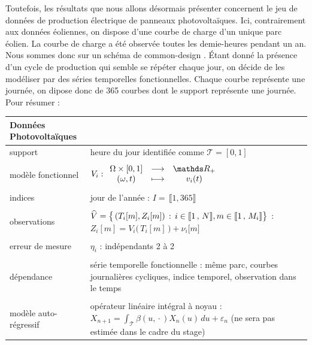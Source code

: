 \bigskip

Toutefois, les résultats que nous allons désormais présenter concernent le jeu de données de production électrique de panneaux photovoltaïques. Ici, contrairement aux données éoliennes, on dispose d'une courbe de charge d'un unique parc éolien. La courbe de charge a été observée toutes les demie-heures pendant un an. Nous sommes donc sur un schéma de \og common-design \fg. Étant donné la présence d'un \og cycle de production \fg qui semble se répéter chaque jour, on décide de les modéliser par des séries temporelles fonctionnelles. Chaque courbe représente une journée, on dipose donc de 365 courbes dont le support représente une journée. Pour résumer :

\bigskip

\noalign\begin{tabularx}{\textwidth}{XX}
	\toprule
	\textbf{Données Photovoltaïques}                                                                                                                                                                       \\
	\midrule
	support            & heure du jour identifiée comme $\mathcal T = [0,1]$                                                                                                                               \\
	\\
	modèle fonctionnel & ${V}_i : \func {\Omega \times [0,1]} {\mathds R_+} {(\omega, t)} {v_i(t)}$                                                                                                        \\
	\\
	indices            & jour de l'année : $I = \, \llbracket 1, 365 \rrbracket$                                                                                                                           \\
	\\
	observations       & $\widehat V = \bigl\{ \, (T_i[m], Z_i[m]) \, : \, i \in \llbracket 1 \, , \, N \rrbracket, m \in \llbracket 1 \, , \, M_i \rrbracket \bigr\}$ : $Z_i[m] = V_i\bigl( \, T_i[m] \, \bigr) + \nu_i\bigl[ m \bigr]$ \\
	\\
	erreur de mesure   & $\eta_i$ : indépendants 2 à 2                                                                                                                                                     \\
	\\
	dépendance         & série temporelle fonctionnelle : même parc, courbes journalières cycliques, indice temporel, observation dans le temps                                                                               \\
	\\
	modèle auto-régressif & opérateur linéaire intégral à noyau : $X_{n+1} = \displaystyle\int_{\mathcal T} \beta(u, \, \mathbf{\cdot} \,) X_n(u) \, du + \varepsilon_n$ (ne sera pas estimée dans le cadre du stage) 
	\\
	\bottomrule
\end{tabularx}

